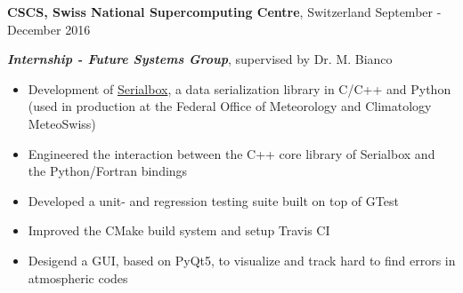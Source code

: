 
\textbf{CSCS, Swiss National Supercomputing Centre}, Switzerland \hfill September - December 2016

\textbf{\textit{Internship - Future Systems Group}}, supervised by Dr. M. Bianco

\begin{itemize}
    \item Development of \href{https://github.com/eth-cscs/serialbox2}{Serialbox}, a data serialization library in C/C++ and Python (used in production at the Federal Office of Meteorology and Climatology MeteoSwiss)
    \item Engineered the interaction between the C++ core library of Serialbox and the Python/Fortran bindings
	\item Developed a unit- and regression testing suite built on top of GTest
    \item Improved the CMake build system and setup Travis CI
    \item Desigend a GUI, based on PyQt5, to visualize and track hard to find errors in atmospheric codes
\end{itemize}
